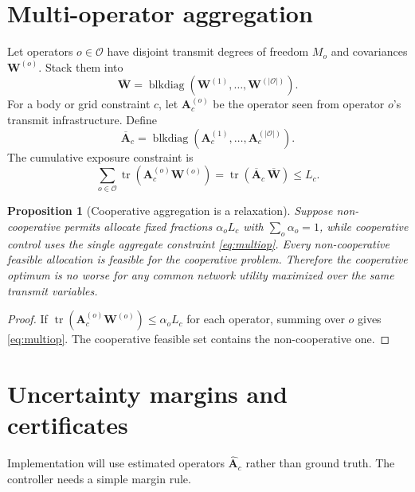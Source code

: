 \documentclass[11pt,a4paper]{article}
\theoremstyle{definition}
\theoremstyle{plain}
\newtheorem{proposition}[definition]{Proposition}
\newcommand{\W}{\mathbf W}
\newcommand{\A}{\mathbf A}
\newcommand{\Ops}{\mathcal O}
\newcommand{\tr}{\operatorname{tr}}
\newcommand{\blkdiag}{\operatorname{blkdiag}}
\begin{document}
\section{Multi-operator aggregation}

Let operators $o\in\Ops$ have disjoint transmit degrees of freedom
$M_o$ and covariances $\W^{(o)}$.  Stack them into
\begin{equation}
  \overline{\W}=\blkdiag(\W^{(1)},\ldots,\W^{(|\Ops|)}).
\end{equation}
For a body or grid constraint $c$, let $\A_c^{(o)}$ be the operator seen
from operator $o$'s transmit infrastructure.  Define
\begin{equation}
  \overline{\A}_c=
  \blkdiag(\A_c^{(1)},\ldots,\A_c^{(|\Ops|)}).
\end{equation}
The cumulative exposure constraint is
\begin{equation}\label{eq:multiop}
  \sum_{o\in\Ops}\tr(\A_c^{(o)}\W^{(o)})
  =
  \tr(\overline{\A}_c\,\overline{\W})
  \le L_c.
\end{equation}

\begin{proposition}[Cooperative aggregation is a relaxation]\label{prop:coop}
Suppose non-cooperative permits allocate fixed fractions
$\alpha_o L_c$ with $\sum_o\alpha_o=1$, while cooperative control uses
the single aggregate constraint \eqref{eq:multiop}.  Every
non-cooperative feasible allocation is feasible for the cooperative
problem.  Therefore the cooperative optimum is no worse for any common
network utility maximized over the same transmit variables.
\end{proposition}

\begin{proof}
If $\tr(\A_c^{(o)}\W^{(o)})\le\alpha_oL_c$ for each operator, summing over
$o$ gives \eqref{eq:multiop}.  The cooperative feasible set contains the
non-cooperative one.
\end{proof}

\section{Uncertainty margins and certificates}

Implementation will use estimated operators
$\widehat{\A}_c$ rather than ground truth.  The controller needs a simple
margin rule.
\end{document}
